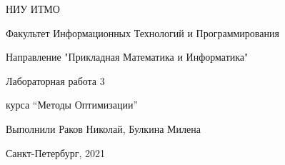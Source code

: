 \documentclass[a4paper,12pt]{article}
\begin{document}
\begin{titlepage}

\thispagestyle{empty}

\centerline{НИУ ИТМО}
\centerline{Факультет Информационных Технологий и Программирования}
\centerline{Направление "Прикладная Математика и Информатика"}

\vfill

\centerline{\huge{Лабораторная работа 3}}
\centerline{\large{курса ``Методы Оптимизации'' }}
\vspace{1cm} 
\centerline{\large{Выполнили Раков Николай, Булкина Милена}}
\vfill

\centerline{Санкт-Петербург, 2021}
\clearpage
\end{titlepage}

\end{document}
